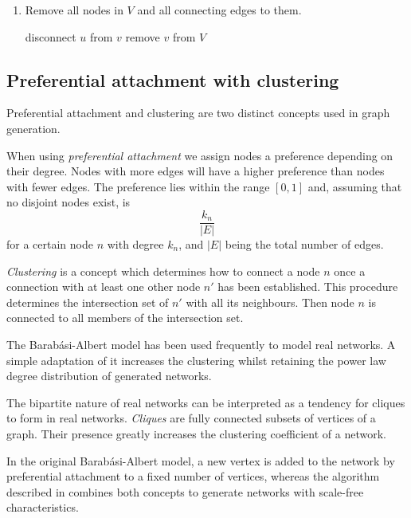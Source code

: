 \documentclass[a4paper,11pt,titlepage]{article}
\begin{document}
\begin{enumerate}
  \item Remove all nodes in $V$ and all connecting edges to them.

    \begin{algorithmic}
            \STATE disconnect $u$ from $v$
          \ENDIF
        \ENDFOR
        \STATE remove $v$ from $V$
      \ENDFOR
    \end{algorithmic}

\end{enumerate}

\subsection{Preferential attachment with clustering}

Preferential attachment and clustering are two distinct concepts used
in graph generation.

When using \emph{preferential attachment} we assign nodes a preference
depending on their degree. Nodes with more edges will have a higher
preference than nodes with fewer edges. The preference lies within the
range $[0,1]$ and, assuming that no disjoint nodes exist, is
\[ \frac{k_n}{|E|} \]
for a certain node $n$ with degree $k_n$,
and $|E|$ being the total number of edges.

\emph{Clustering} is a concept which determines how to connect a
node $n$ once a connection with at least one other node $n'$ has
been established. This procedure determines the intersection set
of $n'$ with all its neighbours. Then node $n$ is connected to
all members of the intersection set.

The Barab\'{a}si-Albert model has been used frequently to model real
networks. A simple adaptation of it increases the clustering whilst
retaining the power law degree distribution of generated networks.


The bipartite nature of real networks can be interpreted as a
tendency for cliques to form in real networks. \emph{Cliques} are
fully connected subsets of vertices of a graph. Their presence
greatly increases the clustering coefficient of a network.

In the original Barab\'{a}si-Albert model, a new vertex is added to
the network by preferential attachment to a fixed number of
vertices, whereas the algorithm described in \cite{oconn11} combines
both concepts to generate networks with scale-free characteristics.
\end{document}
